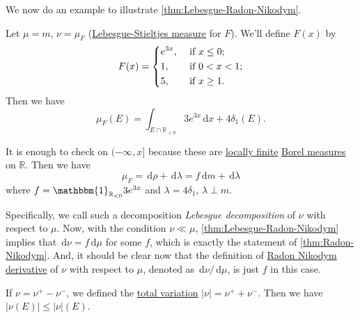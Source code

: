 We now do an example to illustrate \autoref{thm:Lebesgue-Radon-Nikodym}.
\begin{eg}
	Let \(\mu = m\), \(\nu = \mu_F\) (\hyperref[def:Lebesgue-Stieltjes-measure]{Lebesgue-Stieltjes measure} for \(F\)). We'll define \(F(x)\) by
	\[
		F(x) = \begin{dcases}
			e^{3x}, & \text{ if } x\leq 0 ;   \\
			1,      & \text{ if } 0 < x < 1 ; \\
			5,      & \text{ if } x \geq 1 .
		\end{dcases}
	\]
	Then we have
	\[
		\mu_F(E) = \int_{E \cap \mathbb{R}_{< 0}} 3e^{3x} \,\mathrm{d}x + 4 \delta_1(E).
	\]
\end{eg}
\begin{explanation}
	It is enough to check on \((-\infty,x]\) because these are \hyperref[def:locally-finite]{locally finite} \hyperref[def:Borel-measure]{Borel measures} on \(\mathbb{R}\).
	Then we have
	\[
		\mu_F = \,\mathrm{d}\rho + \,\mathrm{d}\lambda = f\,\mathrm{d}m + \,\mathrm{d}\lambda
	\]
	where \(f = \mathbbm{1}_{\mathbb{R}_{< 0}}3e^{3x}\) and \(\lambda = 4\delta_1\), \(\lambda \perp m\).
\end{explanation}

Specifically, we call such a decomposition \emph{Lebesgue decomposition} of \(\nu \) with respect to \(\mu \). Now, with the condition \(\nu \ll \mu \), \autoref{thm:Lebesgue-Radon-Nikodym}
implies that \(\,\mathrm{d} \nu = f \,\mathrm{d} \mu \) for some \(f\), which is exactly the statement of \autoref{thm:Radon-Nikodym}. And, it should
be clear now that the definition of \hyperref[def:Radon-Nikodym-derivative]{Radon Nikodym derivative} of \(\nu \) with respect to \(\mu \), denoted as
\(\,\mathrm{d} \nu / \,\mathrm{d} \mu \), is just \(f\) in this case.

\begin{prev}
	If \(\nu = \nu^+ - \nu^-\), we defined the \hyperref[def:total-variation]{total variation} \(\left\vert \nu \right\vert = \nu^+ + \nu^-\).
	Then we have \(\left\vert \nu(E) \right\vert \leq \left\vert \nu \right\vert(E)\).
\end{prev}

